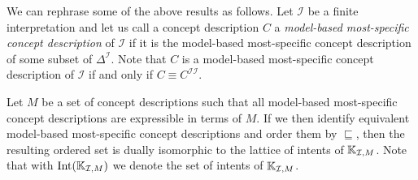 We can rephrase some of the above results as follows.  Let $\mathcal{I}$ be a finite
interpretation and let us call a concept description $C$ a \emph{model-based most-specific
  concept description} of $\mathcal{I}$ if it is the model-based most-specific concept
description of some subset of $\Delta^{\mathcal{I}}$.  Note that $C$ is a model-based
most-specific concept description of $\mathcal{I}$ if and only if $C \equiv
C^{\mathcal{I}\mathcal{I}}$.

Let $M$ be a set of concept descriptions such that all model-based most-specific concept
descriptions are expressible in terms of $M$.  If we then identify equivalent model-based
most-specific concept descriptions and order them by $\sqsubseteq$, then the resulting
ordered set is dually isomorphic to the lattice of intents of ${\mathbb{K}}_{\mathcal{I}, M}$.
Note that with $\operatorname{Int}({\mathbb{K}}_{\mathcal{I}, M})$ we denote the set of intents of ${\mathbb{K}}_{\mathcal{I}, M}$.

